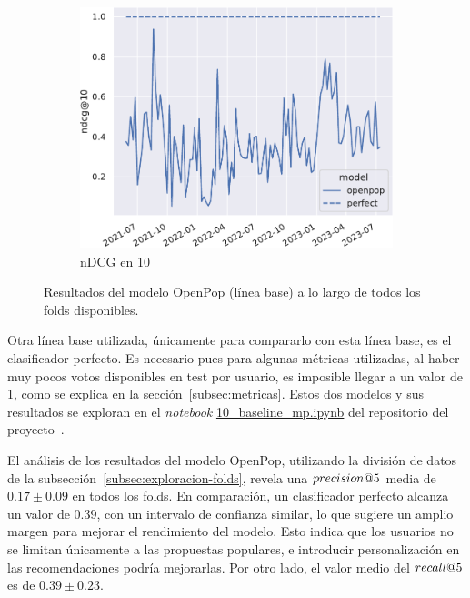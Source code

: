 \begin{figure}[tb]
\begin{subfigure}{.48\textwidth}
        \includegraphics[width=\linewidth]{figures/04_validacion/10_all_ndcg@10_W-THU_True_Decentraland.pdf}
        \caption{nDCG en 10}
        \label{fig:openpop_ndcg@10}
    \end{subfigure}
    \caption[Resultados del modelo línea base.]{Resultados del modelo OpenPop (línea base) a lo largo de todos los folds disponibles.}
    \label{fig:openpop_results}
\end{figure}

Otra línea base utilizada, únicamente para compararlo con esta línea base, es el clasificador perfecto. Es necesario pues para algunas métricas utilizadas, al haber muy pocos votos disponibles en test por usuario, es imposible llegar a un valor de 1, como se explica en la sección~\ref{subsec:metricas}. Estos dos modelos y sus resultados se exploran en el \textit{notebook} \url{10_baseline_mp.ipynb} del repositorio del proyecto~\cite{davo_daviddavoupm-tfm-notebooks_2024}.


El análisis de los resultados del modelo OpenPop, utilizando la división de datos de la subsección~\ref{subsec:exploracion-folds}, revela una $precision@5$ media de $0.17\pm0.09$ en todos los folds. En comparación, un clasificador perfecto alcanza un valor de $0.39$, con un intervalo de confianza similar, lo que sugiere un amplio margen para mejorar el rendimiento del modelo. Esto indica que los usuarios no se limitan únicamente a las propuestas populares, e introducir personalización en las recomendaciones podría mejorarlas. Por otro lado, el valor medio del $recall@5$ es de $0.39\pm0.23$.


